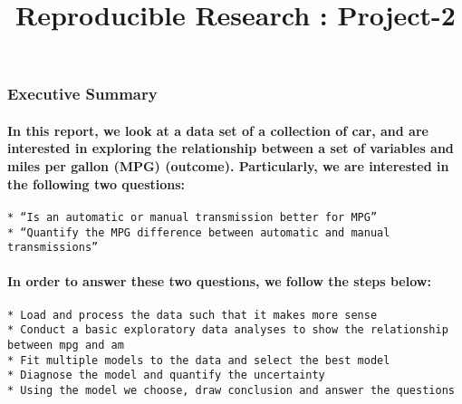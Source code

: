 \documentclass[]{article}
\title{Reproducible Research : Project-2}
\author{}
\date{}
\let\oldparagraph\paragraph
\renewcommand{\paragraph}[1]{\oldparagraph{#1}\mbox{}}
\begin{document}
\maketitle

\hypertarget{executive-summary}{%
\subsubsection{Executive Summary}\label{executive-summary}}

\hypertarget{in-this-report-we-look-at-a-data-set-of-a-collection-of-car-and-are-interested-in-exploring-the-relationship-between-a-set-of-variables-and-miles-per-gallon-mpg-outcome.-particularly-we-are-interested-in-the-following-two-questions}{%
\paragraph{In this report, we look at a data set of a collection of car,
and are interested in exploring the relationship between a set of
variables and miles per gallon (MPG) (outcome). Particularly, we are
interested in the following two
questions:}\label{in-this-report-we-look-at-a-data-set-of-a-collection-of-car-and-are-interested-in-exploring-the-relationship-between-a-set-of-variables-and-miles-per-gallon-mpg-outcome.-particularly-we-are-interested-in-the-following-two-questions}}

\begin{verbatim}
* “Is an automatic or manual transmission better for MPG”
* “Quantify the MPG difference between automatic and manual transmissions”
\end{verbatim}

\hypertarget{in-order-to-answer-these-two-questions-we-follow-the-steps-below}{%
\paragraph{In order to answer these two questions, we follow the steps
below:}\label{in-order-to-answer-these-two-questions-we-follow-the-steps-below}}

\begin{verbatim}
* Load and process the data such that it makes more sense
* Conduct a basic exploratory data analyses to show the relationship between mpg and am
* Fit multiple models to the data and select the best model
* Diagnose the model and quantify the uncertainty
* Using the model we choose, draw conclusion and answer the questions
\end{verbatim}
\end{document}
